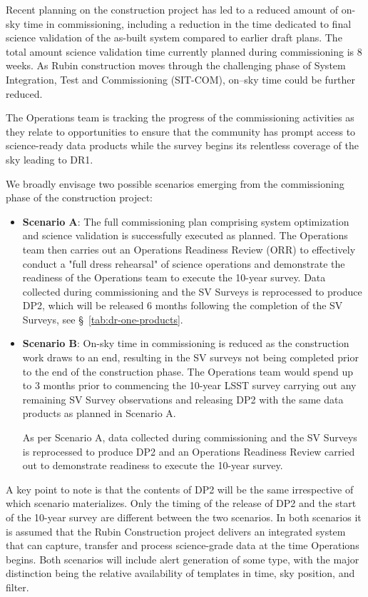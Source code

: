 Recent planning on the construction project has led to a reduced amount of on-sky time in commissioning, including a reduction in the time dedicated to final science validation of the as-built system compared to earlier draft plans.
The total amount science validation time currently planned during commissioning is 8 weeks. 
As Rubin construction moves through the challenging phase of System Integration, Test and Commissioning (SIT-COM), on--sky time could be further reduced.

The Operations team is tracking the progress of the commissioning activities as they relate to \es opportunities to ensure that the community has prompt access to science-ready data products while the survey begins its relentless coverage of the sky leading to DR1.

We broadly envisage two possible scenarios emerging from the commissioning phase of the construction project: 

\begin{itemize}
\item \textbf{Scenario A}:
The full commissioning plan comprising system optimization and science validation is successfully executed as planned. 
The Operations team then carries out an Operations Readiness Review (ORR) to effectively conduct a "full dress rehearsal" of science operations and demonstrate the readiness of the Operations team to execute the 10-year survey. 
Data collected during commissioning and the SV Surveys is reprocessed to produce DP2, which will be released 6 months following the completion of the SV Surveys, see \S~\ref{tab:dr-one-products}.

\item \textbf{Scenario B}:
On-sky time in commissioning is reduced as the construction work  draws to an end, resulting in the SV surveys not being completed prior to the end of the construction phase.  
The Operations team would spend up to 3 months prior to commencing the 10-year LSST survey carrying out any remaining SV Survey observations and releasing DP2 with the same data products as planned in Scenario A.

As per Scenario A, data collected during commissioning and the SV Surveys is reprocessed to produce DP2 and an Operations Readiness Review carried out to demonstrate readiness to execute the 10-year survey. 

\end{itemize}

A key point to note is that the contents of DP2 will be the same irrespective of which scenario materializes.  
Only the timing of the release of DP2 and the start of the 10-year survey are different between the two scenarios. 
In both scenarios it is assumed that the Rubin Construction project delivers an integrated system that can capture, transfer and process science-grade data at the time Operations begins.
Both scenarios will include alert generation of some type, with the major distinction being the relative availability of templates in time, sky position, and filter.


